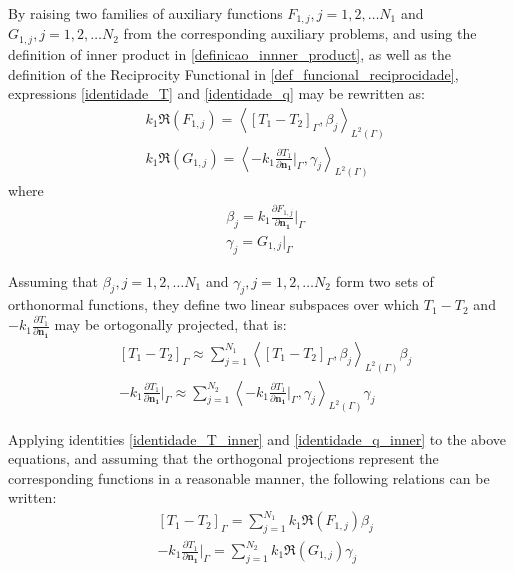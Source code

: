 \documentclass[conference,compsoc,fleqn]{IEEEtran}
\begin{document}
By raising two families of auxiliary functions $F_{1,j}, j=1,2,\ldots N_1$ and $G_{1,j}, j=1,2,\ldots N_2$ from the corresponding auxiliary problems, and using the definition of inner product in \eqref{definicao_innner_product}, as well as the definition of the Reciprocity Functional in \eqref{def_funcional_reciprocidade}, expressions \eqref{identidade_T} and \eqref{identidade_q} may be rewritten as:
\begin{align}
	& k_1 \Re(F_{1,j})
	=
	\left\langle \left[T_1 - T_2\right]_\Gamma, \beta_j\right\rangle _{L^2(\Gamma)}
	\label{identidade_T_inner} \\
	& k_1 \Re(G_{1,j})
	=
	\left\langle  -k_1 \frac{\partial T_1}{\partial\mathbf{n_1}}\bigg|_\Gamma, \gamma_j\right\rangle _{L^2(\Gamma)}
	\label{identidade_q_inner}
\end{align}
where
\begin{align}
	& \beta_j = k_1 \frac{\partial F_{1,j}}{\partial\mathbf{n_1}}\bigg|_\Gamma \label{expressao_define_beta} \\
	& \gamma_j = G_{1,j}\big|_\Gamma \label{expressao_define_gamma}
\end{align}

Assuming that $\beta_j, j=1,2,\ldots N_1$ and $\gamma_j, j=1,2,\ldots N_2$ form two sets of orthonormal functions, they define two linear subspaces over which $T_1 - T_2$ and $-k_1 \frac{\partial T_1}{\partial\mathbf{n_1}}$ may be ortogonally projected, that is:
\begin{align}
	& [T_1 - T_2]_\Gamma \approx \sum_{j=1}^{N_1} \left\langle  \left[T_1 - T_2\right]_\Gamma, \beta_j \right\rangle_{L^2(\Gamma)} \beta_j \\ 
	& - k_1 \frac{\partial T_1}{\partial\mathbf{n_1}}\bigg|_\Gamma \approx \sum_{j=1}^{N_2} \left\langle  -k_1 \frac{\partial T_1}{\partial\mathbf{n_1}}\bigg|_\Gamma, \gamma_j \right\rangle_{L^2(\Gamma)} \gamma_j
\end{align}

Applying identities \eqref{identidade_T_inner} and \eqref{identidade_q_inner} to the above equations, and assuming that the orthogonal projections represent the corresponding functions in a reasonable manner, the following relations can be written:
\begin{align}
	& [T_1 - T_2]_\Gamma = \sum_{j=1}^{N_1} k_1 \Re(F_{1,j}) \beta_j \label{resultado_1} \\
	& - k_1 \frac{\partial T_1}{\partial\mathbf{n_1}}\bigg|_\Gamma = \sum_{j=1}^{N_2} k_1 \Re(G_{1,j}) \gamma_j \label{resultado_2}
\end{align}
\end{document}
